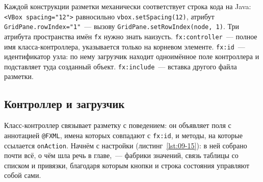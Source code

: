 Каждой конструкции разметки механически соответствует строка кода на Java:
\texttt{<VBox spacing="12">} равносильно \texttt{vbox.setSpacing(12)}, атрибут
\texttt{GridPane.rowIndex="1"}~--- вызову
\texttt{GridPane.setRowIndex(node, 1)}. Три атрибута пространства имён
\texttt{fx} нужно знать наизусть. \texttt{fx:controller}~--- полное имя
класса-контроллера, указывается только на корневом элементе.
\texttt{fx:id}~--- идентификатор узла: по нему загрузчик находит одноимённое
поле контроллера и подставляет туда созданный объект.
\texttt{fx:include}~--- вставка другого файла разметки.

\subsection{Контроллер и загрузчик}

Класс-контроллер связывает разметку с поведением: он объявляет поля с аннотацией
\texttt{@FXML}, имена которых совпадают с \texttt{fx:id}, и методы, на которые
ссылается \texttt{onAction}. Начнём с настройки (листинг~\ref{lst:09-15}): в ней
собрано почти всё, о чём шла речь в главе,~--- фабрики значений, связь таблицы
со списком и привязки, благодаря которым кнопки и строка состояния управляют
собой сами.

